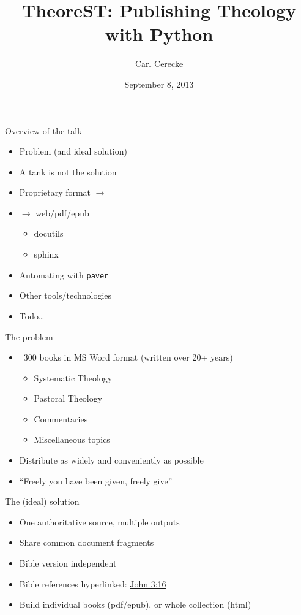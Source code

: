 \documentclass{beamer}
\title{TheoreST: Publishing Theology with Python}
\author{Carl Cerecke}
\institute{Evangelical Bible College of Western Australia}
\date{September 8, 2013}
\begin{document}
    \begin{frame}[plain]
        \titlepage
    \end{frame}

    \begin{frame}{Overview of the talk}
        \begin{itemize}
        \item Problem (and ideal solution)
        \item A tank is not the solution
        \item Proprietary format $\rightarrow$ \rst
        \item \rst $\rightarrow$ web/pdf/epub
            \begin{itemize}
            \item docutils
            \item sphinx
            \end{itemize}
        \item Automating with \texttt{paver}
        \item Other tools/technologies
        \item Todo\ldots
        \end{itemize}
    \end{frame}
    
    \begin{frame}{The problem}
        \begin{itemize}
        \item ~300 books in MS Word format (written over 20+ years)
            \begin{itemize}
            \item Systematic Theology
            \item Pastoral Theology
            \item Commentaries
            \item Miscellaneous topics 
            \end{itemize}
        \item Distribute as widely and conveniently as possible
        \item ``Freely you have been given, freely give''
        \end{itemize}
    \end{frame}
    
    \begin{frame}{The (ideal) solution}
        \begin{itemize}
        \item One authoritative source, multiple outputs
        \item Share common document fragments
        \item Bible version independent
        \item Bible references hyperlinked: \href{http://some.url}{John 3:16}
        \item Build individual books (pdf/epub), or whole collection (html)
    \end{itemize}
\end{frame}
    
\end{document}
